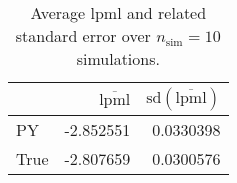 \begin{table}[H]

\caption{Average lpml and related standard error over $n_{\text{sim}} = 10$ simulations.}
\centering
\begin{tabular}[t]{lrr}
\toprule
  & $\overbar{\text{lpml}}$ & $\text{sd}(\overbar{\text{lpml}})$\\
\midrule
PY & -2.852551 & 0.0330398\\
True & -2.807659 & 0.0300576\\
\bottomrule
\end{tabular}
\end{table}